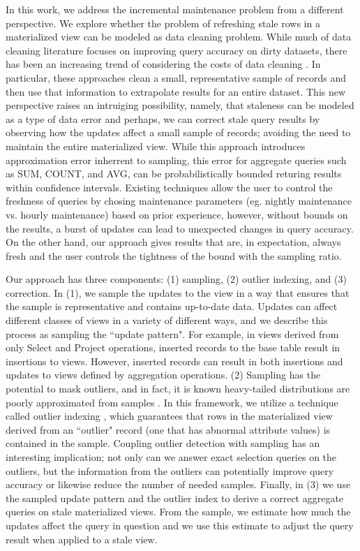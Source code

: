 In this work, we address the incremental maintenance problem from a different perspective.
We explore whether the problem of refreshing stale rows in a materialized view can be modeled as data cleaning problem.
While much of data cleaning literature focuses on improving query accuracy on dirty datasets,
there has been an increasing trend of considering the costs of data cleaning \cite{wang1999sample}.
In particular, these approaches clean a small, representative sample of records and then use that information to extrapolate results for an entire dataset.
This new perspective raises an intruiging possibility, namely, that staleness can be modeled as a type of data error 
and perhaps, we can correct stale query results by observing how the updates affect a small sample of records; 
avoiding the need to maintain the entire materialized view.
While this approach introduces approximation error inherrent to sampling, this error for aggregate queries such as SUM, COUNT, and AVG, 
can be probabilistically bounded returing results within confidence intervals.
Existing techniques allow the user to control the freshness of queries by chosing maintenance parameters (eg. nightly maintenance vs. hourly maintenance) based on prior experience, however, without bounds on the results, a burst of updates can lead to unexpected changes in query accuracy.
On the other hand, our approach gives results that are, in expectation, always fresh and the user controls the tightness of the bound with the sampling ratio.

Our approach has three components: (1) sampling, (2) outlier indexing, and (3) correction. In (1), we sample the updates to the view in a way that ensures that the sample is representative and contains up-to-date data. Updates can affect different classes of views in a variety of different ways, and we describe this process as sampling the ``update pattern". For example, in views derived from only Select and Project operations, inserted records to the base table result in insertions to views. However, inserted records can result in both insertions and updates to views defined by aggregation operations. (2) Sampling has the potential to mask outliers, and in fact, it is known
heavy-tailed distributions are poorly approximated from samples \cite{chaudhuri2001overcoming}.
In this framework, we utilize a technique called outlier indexing \cite{chaudhuri2001overcoming}, which guarantees that rows in the materialized view derived from an ``outlier" record (one that has abnormal attribute values) is contained in the sample.
Coupling outlier detection with sampling has an interesting implication; not only can we answer exact selection queries on the outliers, but
the information from the outliers can potentially improve query accuracy or likewise reduce the number of needed samples.
Finally, in (3) we use the sampled update pattern and the outlier index to derive a correct aggregate queries on stale materialized views.
From the sample, we estimate how much the updates affect the query in question and we use this estimate to adjust the query result when applied to a stale view.

